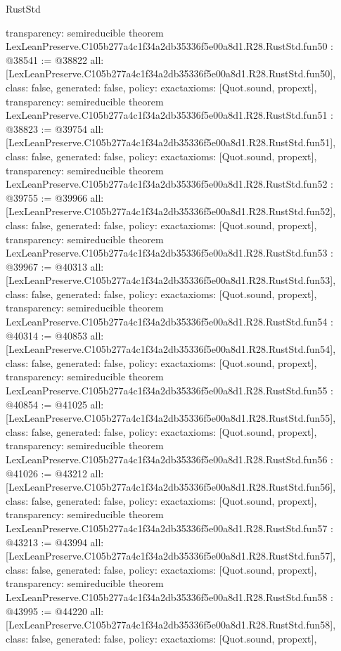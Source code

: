 \begin{lexlean}{RustStd}
\begin{coremodule}
{  transparency: semireducible
}
theorem LexLeanPreserve.C105b277a4c1f34a2db35336f5e00a8d1.R28.RustStd.fun50 : @38541 := @38822 {
  all: [LexLeanPreserve.C105b277a4c1f34a2db35336f5e00a8d1.R28.RustStd.fun50],
  class: false,
  generated: false,
  policy: exact{axioms: [Quot.sound, propext]},
  transparency: semireducible
}
theorem LexLeanPreserve.C105b277a4c1f34a2db35336f5e00a8d1.R28.RustStd.fun51 : @38823 := @39754 {
  all: [LexLeanPreserve.C105b277a4c1f34a2db35336f5e00a8d1.R28.RustStd.fun51],
  class: false,
  generated: false,
  policy: exact{axioms: [Quot.sound, propext]},
  transparency: semireducible
}
theorem LexLeanPreserve.C105b277a4c1f34a2db35336f5e00a8d1.R28.RustStd.fun52 : @39755 := @39966 {
  all: [LexLeanPreserve.C105b277a4c1f34a2db35336f5e00a8d1.R28.RustStd.fun52],
  class: false,
  generated: false,
  policy: exact{axioms: [Quot.sound, propext]},
  transparency: semireducible
}
theorem LexLeanPreserve.C105b277a4c1f34a2db35336f5e00a8d1.R28.RustStd.fun53 : @39967 := @40313 {
  all: [LexLeanPreserve.C105b277a4c1f34a2db35336f5e00a8d1.R28.RustStd.fun53],
  class: false,
  generated: false,
  policy: exact{axioms: [Quot.sound, propext]},
  transparency: semireducible
}
theorem LexLeanPreserve.C105b277a4c1f34a2db35336f5e00a8d1.R28.RustStd.fun54 : @40314 := @40853 {
  all: [LexLeanPreserve.C105b277a4c1f34a2db35336f5e00a8d1.R28.RustStd.fun54],
  class: false,
  generated: false,
  policy: exact{axioms: [Quot.sound, propext]},
  transparency: semireducible
}
theorem LexLeanPreserve.C105b277a4c1f34a2db35336f5e00a8d1.R28.RustStd.fun55 : @40854 := @41025 {
  all: [LexLeanPreserve.C105b277a4c1f34a2db35336f5e00a8d1.R28.RustStd.fun55],
  class: false,
  generated: false,
  policy: exact{axioms: [Quot.sound, propext]},
  transparency: semireducible
}
theorem LexLeanPreserve.C105b277a4c1f34a2db35336f5e00a8d1.R28.RustStd.fun56 : @41026 := @43212 {
  all: [LexLeanPreserve.C105b277a4c1f34a2db35336f5e00a8d1.R28.RustStd.fun56],
  class: false,
  generated: false,
  policy: exact{axioms: [Quot.sound, propext]},
  transparency: semireducible
}
theorem LexLeanPreserve.C105b277a4c1f34a2db35336f5e00a8d1.R28.RustStd.fun57 : @43213 := @43994 {
  all: [LexLeanPreserve.C105b277a4c1f34a2db35336f5e00a8d1.R28.RustStd.fun57],
  class: false,
  generated: false,
  policy: exact{axioms: [Quot.sound, propext]},
  transparency: semireducible
}
theorem LexLeanPreserve.C105b277a4c1f34a2db35336f5e00a8d1.R28.RustStd.fun58 : @43995 := @44220 {
  all: [LexLeanPreserve.C105b277a4c1f34a2db35336f5e00a8d1.R28.RustStd.fun58],
  class: false,
  generated: false,
  policy: exact{axioms: [Quot.sound, propext]},
}
\end{coremodule}
\end{lexlean}
